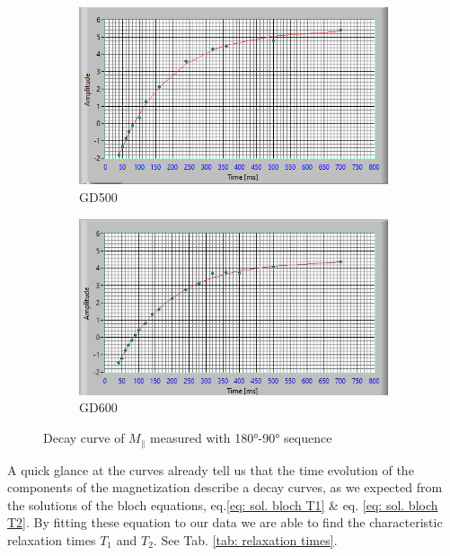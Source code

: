 \begin{figure}[!htbp]
  \centering
  \begin{subfigure}[b]{0.45\textwidth}
    \centering
    \includegraphics[width=\textwidth]{./Protocol images/GD500_T1 (1).png}
    \caption{GD500}
    \label{fig:GD500 T1}
  \end{subfigure}
  \hfill
  \begin{subfigure}[b]{0.45\textwidth}
    \centering
    \includegraphics[width=\textwidth]{./Protocol images/GD600_T1 (1).jpg}
    \caption{GD600}
    \label{fig:GD600 T1}
  \end{subfigure}
  \caption{Decay curve of $M_\parallel$ measured with 180°-90° sequence}
  \label{fig:subsidebyside}
\end{figure}
A quick glance at the curves already tell  us that the time evolution of the components of the magnetization describe a decay curves, as we expected from the solutions of the bloch equations,  eq.\ref{eq: sol. bloch T1} \& eq. \ref{eq: sol. bloch T2}. By fitting these equation to our data we are able to find the characteristic relaxation times $T_1$ and $T_2$. See Tab. \ref{tab: relaxation times}.
